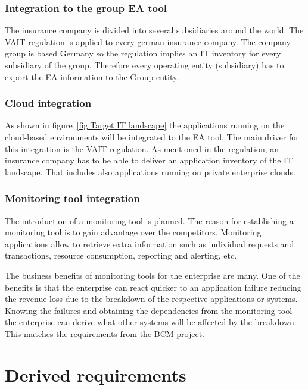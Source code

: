 \subsubsection{Integration to the group EA tool}

The insurance company is divided into several subsidiaries around the world. The VAIT regulation is applied to every german insurance company. The company group is based Germany so the regulation implies an IT inventory for every subsidiary of the group. Therefore every operating entity (subsidiary) has to export the EA information to the Group entity.

\subsubsection{Cloud integration}

As shown in figure~\ref{fig:Target IT landscape} the applications running on the cloud-based environments will be integrated to the EA tool. The main driver for this integration is the VAIT regulation. As mentioned in the regulation, an insurance company has to be able to deliver an application inventory of the IT landscape. That includes also applications running on private enterprise clouds. 

\subsubsection{Monitoring tool integration}

The introduction of a monitoring tool is planned. The reason for establishing a monitoring tool is to gain advantage over the competitors. Monitoring applications allow to retrieve extra information such as individual requests and transactions, resource consumption, reporting and alerting, etc.

The business benefits of monitoring tools for the enterprise are many. One of the benefits is that the enterprise can react quicker to an application failure reducing the revenue loss due to the breakdown of the respective applications or systems. Knowing the failures and obtaining the dependencies from the monitoring tool the enterprise can derive what other systems will be affected by the breakdown. This matches the requirements from the BCM project.

\section{Derived requirements}\label{section:derivedrequirements}

